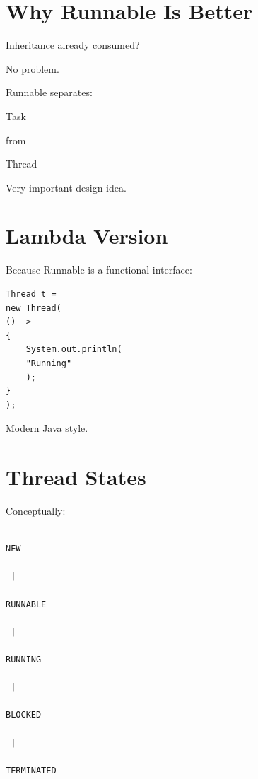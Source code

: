 \documentclass[11pt,a4paper]{book}
\begin{document}

\section{Why Runnable Is Better}

Inheritance already consumed?


No problem.


Runnable separates:


Task

from

Thread


Very important design idea.


\section{Lambda Version}

Because Runnable is a
functional interface:

\begin{verbatim} 
Thread t =
new Thread(
() ->
{
    System.out.println(
    "Running"
    );
}
);
\end{verbatim}


Modern Java style.


\section{Thread States}

Conceptually:

\begin{verbatim}

NEW

 |

RUNNABLE

 |

RUNNING

 |

BLOCKED

 |

TERMINATED

\end{verbatim}
\end{document}
